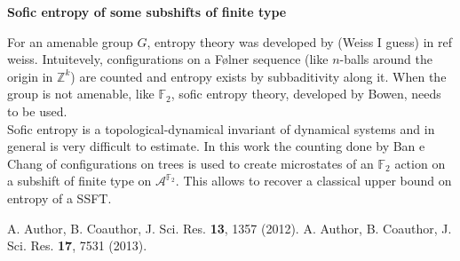\documentclass[12pt,a4paper]{article}
\begin{document}
\begin{center}
{\large{\bf Sofic entropy of some subshifts of finite type } }
\\

\end{center}

\noindent

For an amenable group $G$, entropy theory was developed by (Weiss I
guess) in ref weiss. Intuitevely, configurations on a Følner sequence (like $n$-balls around
the origin in $\mathbb{Z}^k$)
are counted and entropy exists by subbaditivity along it. When the group
is not amenable, like $\mathbb{F}_2$, sofic entropy theory, developed
by Bowen, needs to be used. 
\\
Sofic entropy is a topological-dynamical
invariant of dynamical systems and in general is very difficult to
estimate. In this work the counting done by Ban e Chang of configurations
on trees is used to 
create microstates of an $\mathbb{F}_2$ action on a subshift of finite type on
$\mathcal{A}^{\mathbb{F}_2}$. This allows to recover a classical 
upper bound on entropy of a SSFT. 



\begingroup
\renewcommand{\section}[2]{}
\begin{thebibliography}{0}
\setlength{\parskip}{0mm}
\setlength{\itemsep}{-0.3mm}
\small
{} A. Author, B. Coauthor, J. Sci. Res. \textbf{13}, 1357 (2012).
 A. Author, B. Coauthor, J. Sci. Res. \textbf{17}, 7531 (2013).
\end{thebibliography}
\endgroup
\end{document}

